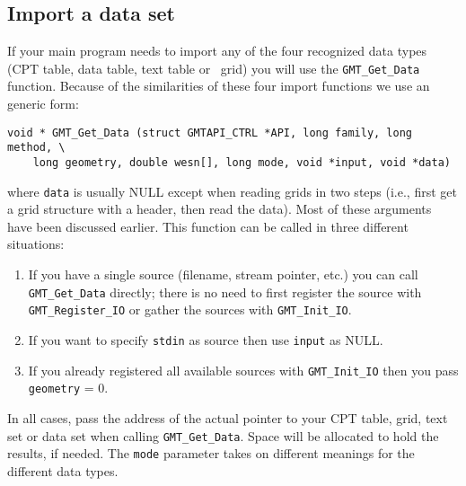 \documentclass{report}
\begin{document}
\subsection{Import a data set}

If your main program needs to import any of the four recognized data types (CPT table, data table, text table or \GMT\ grid)
you will use the \texttt{GMT\_Get\_Data} function.
Because of the similarities of these four import functions we use
an generic form:

\begin{verbatim}
void * GMT_Get_Data (struct GMTAPI_CTRL *API, long family, long method, \
    long geometry, double wesn[], long mode, void *input, void *data)
\end{verbatim}
where \texttt{data} is usually NULL except when reading grids in two steps
(i.e., first get a grid structure with a header, then read the data).
Most of these arguments have been discussed earlier.  This function can
be called in three different situations:
\begin{enumerate}
\item If you have a single source (filename, stream pointer, etc.) you can call
\texttt{GMT\_Get\_Data} directly; there is no need to first register the source
with \texttt{GMT\_Register\_IO} or gather the sources with \texttt{GMT\_Init\_IO}.
\item If you want to specify \texttt{stdin} as source then use \texttt{input} as NULL.
\item If you already registered all available sources with \texttt{GMT\_Init\_IO} then
you pass \texttt{geometry} = 0.
\end{enumerate}
In all cases, pass the address of the actual pointer to your CPT table, grid, text set or data set
when calling \texttt{GMT\_Get\_Data}.  Space will
be allocated to hold the results, if needed.
The \texttt{mode} parameter takes on different meanings for the different data types.
\end{document}
